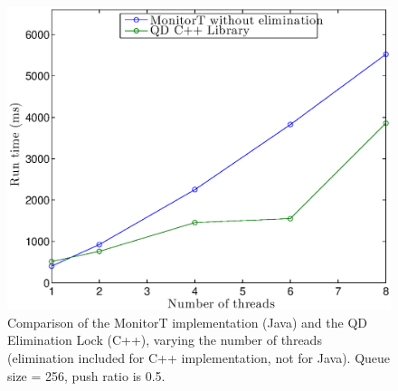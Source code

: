 \begin{figure}[]
\centering
\includegraphics[width=.75\textwidth]{figs/02_TimeVsThreads_cppElim_javaNoElim.eps}
\caption[]{Comparison of the MonitorT implementation (Java) and the QD Elimination Lock (C++), varying the number of threads (elimination included for C++ implementation, not for Java). Queue size = 256, push ratio is 0.5.}
\label{fig:fig02}
\end{figure}

